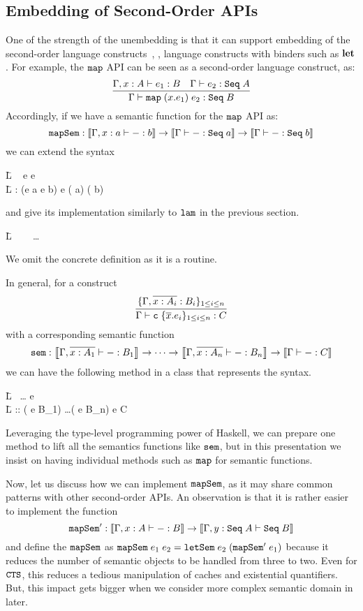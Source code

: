 \documentclass{article}
\theoremstyle{definition}
\begin{document}
\subsection{Embedding of Second-Order APIs}

One of the strength of the unembedding is that it can support embedding of the second-order language constructs~, \ie, language constructs with binders such as $\mathbf{let}$. 
For example, the $\texttt{map}$ API can be seen as a second-order language construct, as: 
\[
\infer
{
 \Gamma \vdash \var{map} \A (x.e_1) \A e_2 : \con{Seq} \A B 
}
{
 \Gamma, x : A \vdash e_1 : B 
 & 
 \Gamma \vdash e_2 : \con{Seq} \A A
}
\]
Accordingly, if we have a semantic function for the $\texttt{map}$ API as:
\[
\var{mapSem} : \sem{ \Gamma, x : a \vdash - : b } \to \sem{ \Gamma \vdash - : \con{Seq} \A a} \to  \sem{ \Gamma \vdash - : \con{Seq} \A b }
\]
we can extend the syntax 
\begin{code}
\=L ~ \A e \To {} \A e~~\\
\=L \quad 
         : (e \A a \to e \A b) \to e \A ( \A a) \to ( \A b) 
\end{code}
and give its implementation similarly to $\texttt{lam}$ in the previous section. 
\begin{code}
\=L ~ \A {}~\WHERE~\dots 
\end{code}
We omit the concrete definition as it is a routine. 

In general, for a construct 
\[
\infer
{ 
 \Gamma \vdash \con{c} \A \{ \V{x}.e_i \}_{1 \le i \le n} : C
}
{
  \{ \Gamma, \V{x : A_i} : B_i \}_{1 \le i \le n}
}
\]
with a corresponding semantic function 
\[
\var{sem} : \sem{ \Gamma, \V{x : A_1} \vdash - : B_1} \to \dots \to \sem{ \Gamma, \V{x : A_n} \vdash - : B_n} \to \sem{ \Gamma \vdash - : C }
\]
we can have the following method in a class that represents the syntax. 
\begin{code}
\=L ~\dots \To {} \A e~\WHERE\\
\=L \quad {} :: ( \to e \A B_1) \to \dots \to ( \to e \A B_n) \to e \A C 
\end{code}
Leveraging the type-level programming power of Haskell, we can prepare one method to lift all the semantics functions like $\texttt{sem}$, but in this presentation we 
insist on having individual methods such as $\texttt{map}$ for semantic functions. 

Now, let us discuss how we can implement $\texttt{mapSem}$, as it may share common patterns with other second-order APIs. 
An observation is that it is rather easier to 
implement the function 
\[
\var{mapSem}' : \sem{ \Gamma, x : A \vdash - : B } \to \sem{ \Gamma, y : \con{Seq} \A A \vdash \con{Seq} \A B }
\]
and define the $\texttt{mapSem}$ as $\texttt{mapSem} \; e_1 \; e_2 = \texttt{letSem} \; e_2 \; (\texttt{mapSem}' \; e_1)$
because it reduces the number of semantic objects to be handled from three to two. Even for $\texttt{CTS}$, this reduces a tedious 
manipulation of caches and existential quantifiers. But, this impact gets bigger when we consider more complex semantic domain in later. 
\end{document}
